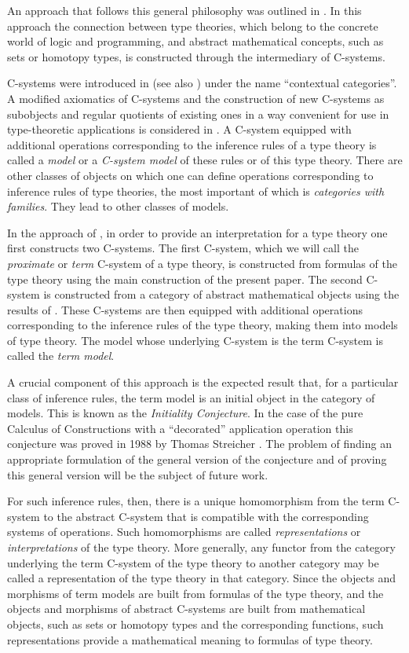 \documentclass[onecolumn,12pt]{amsart}
\numberwithin{proposition}{subsection}
\begin{document}
An approach that follows this general philosophy was outlined in
\cite{CMUtalk}. In this approach the connection between type theories,
which belong to the concrete world of logic and programming, and abstract
mathematical concepts, such as sets or homotopy types, is constructed through the
intermediary of C-systems.

C-systems were introduced in \cite{Cartmell0} (see also \cite{Cartmell1}) under
the name ``contextual categories''. A modified axiomatics of C-systems and the
construction of new C-systems as subobjects and regular quotients of 
existing ones in a way convenient for use in type-theoretic applications is
considered in \cite{Csubsystems}. A C-system equipped with additional
operations corresponding to the inference rules of a type theory is called a
{\em model} or a {\em C-system model} of these rules or of this type theory. There are
other classes of objects on which one can define operations corresponding to
inference rules of type theories, the most important of which is {\em categories with families}.
They lead to other classes of models.

In the approach of \cite{CMUtalk}, in order to provide an interpretation for a
type theory one first constructs two C-systems.  The first C-system, which we will
call the {\em proximate} or {\em term} C-system of a type theory, is constructed from
formulas of the type theory using the main construction of the present paper.
The second C-system is constructed from a category of abstract mathematical
objects using the results of \cite{Cfromauniverse}. These C-systems are then
equipped with additional operations corresponding to the inference rules of the
type theory, making them into models of type theory.  The model whose underlying
C-system is the term C-system is called the {\em term model}.

A crucial component of this approach is the expected result that, for a
particular class of inference rules, the term model is an initial object in the
category of models. This is known as the {\em Initiality Conjecture}. In the case of
the pure Calculus of Constructions with a ``decorated'' application operation
this conjecture was proved in 1988 by Thomas Streicher \cite{Streicher}. The
problem of finding an appropriate formulation of the general version of the
conjecture and of proving this general version will be the subject of future
work.

For such inference rules, then, there is a unique homomorphism from the term
C-system to the abstract C-system that is compatible with the corresponding
systems of operations. Such homomorphisms are called {\em representations} or
{\em interpretations} of the type theory. More generally, any functor from the
category underlying the term C-system of the type theory to another category
may be called a representation of the type theory in that category. Since
the objects and morphisms of term models are built from formulas of the type theory,
and the objects and morphisms of abstract C-systems are built from mathematical
objects, such as sets or homotopy types and the corresponding functions, such
representations provide a mathematical meaning to formulas of type theory.
\end{document}
